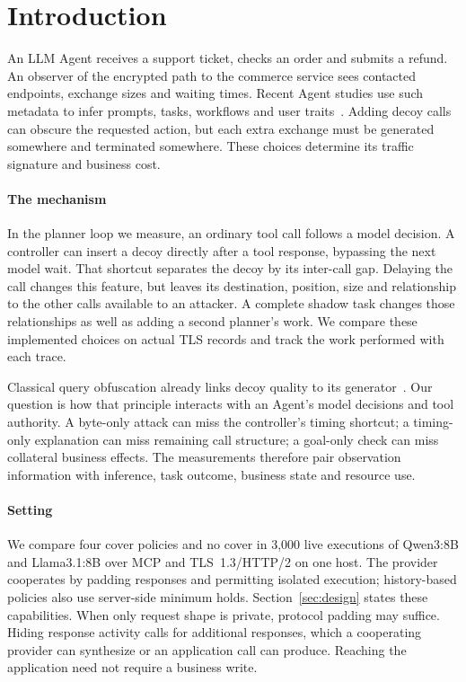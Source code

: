 \section{Introduction}\label{sec:intro}
An LLM Agent receives a support ticket, checks an order and submits a refund. An observer of the encrypted path to the commerce service sees contacted endpoints, exchange sizes and waiting times. Recent Agent studies use such metadata to infer prompts, tasks, workflows and user traits~\cite{jeong2026wra,dangol2026workflow,pouryousef2026traffic,li2026ant}. Adding decoy calls can obscure the requested action, but each extra exchange must be generated somewhere and terminated somewhere. These choices determine its traffic signature and business cost.

\paragraph{The mechanism}
In the planner loop we measure, an ordinary tool call follows a model decision. A controller can insert a decoy directly after a tool response, bypassing the next model wait. That shortcut separates the decoy by its inter-call gap. Delaying the call changes this feature, but leaves its destination, position, size and relationship to the other calls available to an attacker. A complete shadow task changes those relationships as well as adding a second planner's work. We compare these implemented choices on actual TLS records and track the work performed with each trace.

Classical query obfuscation already links decoy quality to its generator~\cite{howe2008trackmenot,peddinti2010trackmenot,balsa2012obpws}. Our question is how that principle interacts with an Agent's model decisions and tool authority. A byte-only attack can miss the controller's timing shortcut; a timing-only explanation can miss remaining call structure; a goal-only check can miss collateral business effects. The measurements therefore pair observation information with inference, task outcome, business state and resource use.



\paragraph{Setting}
We compare four cover policies and no cover in 3,000 live executions of Qwen3:8B and Llama3.1:8B over MCP and TLS~1.3/HTTP/2 on one host. The provider cooperates by padding responses and permitting isolated execution; history-based policies also use server-side minimum holds. Section~\ref{sec:design} states these capabilities. When only request shape is private, protocol padding may suffice. Hiding response activity calls for additional responses, which a cooperating provider can synthesize or an application call can produce. Reaching the application need not require a business write.

